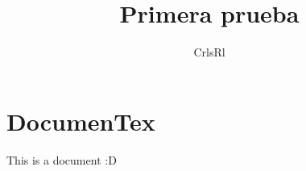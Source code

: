 \documentclass{12pt,letterpaper}
\title{Primera prueba}
\author{CrlsRl}
\begin{document}
\maketitle
\section{DocumenTex}
This is a document :D
\end{document}
